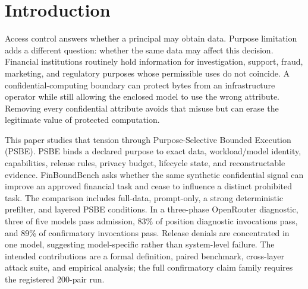 \section{Introduction}

Access control answers whether a principal may obtain data. Purpose limitation
adds a different question: whether the same data may affect this decision.
Financial institutions routinely hold information for investigation, support,
fraud, marketing, and regulatory purposes whose permissible uses do not
coincide. A confidential-computing boundary can protect bytes from an
infrastructure operator while still allowing the enclosed model to use the
wrong attribute. Removing every confidential attribute avoids that misuse but
can erase the legitimate value of protected computation.

This paper studies that tension through Purpose-Selective Bounded Execution
(PSBE). PSBE binds a declared purpose to exact data, workload/model identity,
capabilities, release rules, privacy budget, lifecycle state, and reconstructable
evidence. FinBoundBench asks whether the same synthetic confidential signal can
improve an approved financial task and cease to influence a distinct prohibited
task. The comparison includes full-data, prompt-only, a strong deterministic
prefilter, and layered PSBE conditions. In a three-phase OpenRouter diagnostic,
three of five models pass admission, 83\% of position diagnostic invocations
pass, and 89\% of confirmatory invocations pass. Release denials are
concentrated in one model, suggesting model-specific rather than system-level
failure. The intended contributions are a formal definition, paired benchmark,
cross-layer attack suite, and empirical analysis; the full confirmatory claim
family requires the registered 200-pair run.
